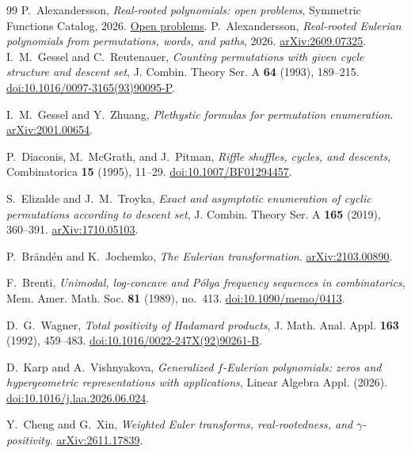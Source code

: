 \documentclass[11pt]{article}
\begin{document}
\begin{thebibliography}{99}
 P.~Alexandersson, \emph{Real-rooted polynomials: open problems},
Symmetric Functions Catalog, 2026.
\href{https://www.symmetricfunctions.com/realRootedOpenProblems.htm}{Open problems}.
 P.~Alexandersson, \emph{Real-rooted Eulerian polynomials
from permutations, words, and paths}, 2026.
\href{https://arxiv.org/abs/2609.07325}{arXiv:2609.07325}.
I.~M.~Gessel and C.~Reutenauer,
\emph{Counting permutations with given cycle structure and descent set},
J. Combin. Theory Ser. A \textbf{64} (1993), 189--215.
\href{https://doi.org/10.1016/0097-3165(93)90095-P}{doi:10.1016/0097-3165(93)90095-P}.

I.~M.~Gessel and Y.~Zhuang,
\emph{Plethystic formulas for permutation enumeration}.
\href{https://arxiv.org/abs/2001.00654}{arXiv:2001.00654}.

P.~Diaconis, M.~McGrath, and J.~Pitman,
\emph{Riffle shuffles, cycles, and descents},
Combinatorica \textbf{15} (1995), 11--29.
\href{https://doi.org/10.1007/BF01294457}{doi:10.1007/BF01294457}.

S.~Elizalde and J.~M.~Troyka,
\emph{Exact and asymptotic enumeration of cyclic permutations according to descent set},
J. Combin. Theory Ser. A \textbf{165} (2019), 360--391.
\href{https://arxiv.org/abs/1710.05103}{arXiv:1710.05103}.

P.~Br\"and\'en and K.~Jochemko, \emph{The Eulerian transformation}.
\href{https://arxiv.org/abs/2103.00890}{arXiv:2103.00890}.

F.~Brenti, \emph{Unimodal, log-concave and P\'olya frequency sequences
in combinatorics}, Mem. Amer. Math. Soc. \textbf{81} (1989), no.~413.
\href{https://doi.org/10.1090/memo/0413}{doi:10.1090/memo/0413}.

D.~G.~Wagner, \emph{Total positivity of Hadamard products},
J. Math. Anal. Appl. \textbf{163} (1992), 459--483.
\href{https://doi.org/10.1016/0022-247X(92)90261-B}{doi:10.1016/0022-247X(92)90261-B}.

D.~Karp and A.~Vishnyakova, \emph{Generalized $f$-Eulerian polynomials:
zeros and hypergeometric representations with applications}, Linear
Algebra Appl. (2026).
\href{https://doi.org/10.1016/j.laa.2026.06.024}{doi:10.1016/j.laa.2026.06.024}.

Y.~Cheng and G.~Xin, \emph{Weighted Euler transforms, real-rootedness,
and $\gamma$-positivity}.
\href{https://arxiv.org/abs/2611.17839}{arXiv:2611.17839}.
\end{thebibliography}
\end{document}
